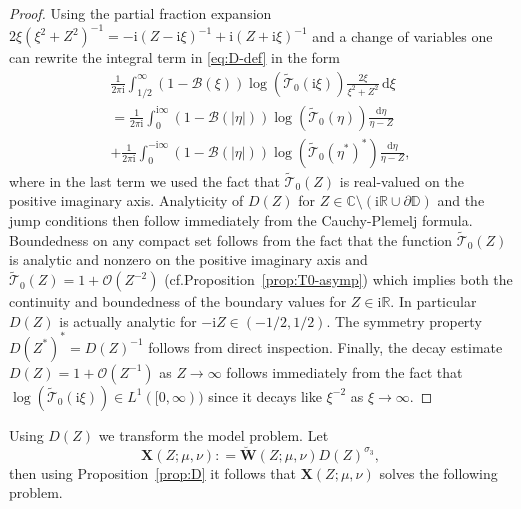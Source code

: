 \documentclass[12pt]{amsart}
\numberwithin{equation}{section}
\newcommand{\dd}{\mathrm{d}}
\newcommand{\ii}{\mathrm{i}}
\newcommand{\C}{\mathbb{C}}
\newcommand{\R}{\mathbb{R}}
\newcommand{\bigo}[1]{ \mathcal{O}\! \left( #1 \right) }
\begin{document}
\begin{proof}
Using the partial fraction expansion 
$2\xi(\xi^2+Z^2)^{-1}=-\ii (Z-\ii\xi)^{-1} +\ii (Z+\ii\xi)^{-1}$
 and a change of variables one can rewrite the integral term in \eqref{eq:D-def} in the form
\begin{multline}
\frac{1}{2\pi\ii}\int_{1/2}^\infty(1-\mathcal{B}(\xi))\log(\widetilde{\mathcal{T}}_0(\ii\xi))\frac{2\xi}{\xi^2+Z^2}\,\dd\xi \\
=
\frac{1}{2\pi\ii}\int_0^{\ii\infty}(1-\mathcal{B}(|\eta|))\log(\widetilde{\mathcal{T}}_0(\eta))\frac{\dd\eta}{\eta-Z} \\
+\frac{1}{2\pi\ii}\int_0^{-\ii\infty}(1-\mathcal{B}(|\eta|))\log(\widetilde{\mathcal{T}}_0(\eta^*)^*)\frac{\dd\eta}{\eta-Z},
\end{multline}
where in the last term we used the fact that $\widetilde{\mathcal{T}}_0(Z)$ is real-valued on the positive imaginary axis.
Analyticity of $D(Z)$ for $Z \in \C \setminus (\ii \R \cup \partial \mathbb{D})$ and the jump conditions then follow immediately from the Cauchy-Plemelj formula. Boundedness on any compact set follows from the fact that the function $\widetilde{\mathcal{T}}_0(Z)$ is analytic and nonzero on the positive imaginary axis and $\widetilde{\mathcal{T}}_0(Z)= 1 + \bigo{Z^{-2}}$ (cf.\@ Proposition~\ref{prop:T0-asymp})  which implies both the continuity and boundedness of the boundary values for $Z \in \ii \R$. In particular $D(Z)$ is actually analytic for $-\ii Z \in (-1/2,1/2)$. 
The symmetry property $D(Z^*)^* = D(Z)^{-1}$ follows from direct inspection. 
Finally, the decay estimate $D(Z) = 1+ \bigo{Z^{-1}}$ as $Z \to \infty$ follows immediately from the fact that $\log( \widetilde{\mathcal{T}}_0(\ii \xi) ) \in L^1([0,\infty))$ since it decays like $\xi^{-2}$ as $\xi \to \infty$.
\end{proof}

Using $D(Z)$ we transform the model problem. Let 
\begin{equation}
	\mathbf{X}(Z;\mu,\nu) : = \breve{\mathbf{W}}(Z;\mu,\nu) D(Z)^{\sigma_3},
	\label{eq:X0-def}
\end{equation}
then using Proposition~\ref{prop:D} it follows that $\mathbf{X}(Z;\mu,\nu)$ solves the following problem.
\end{document}
